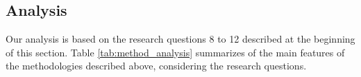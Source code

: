 \subsection{Analysis}
\label{sec:methodology_analisys}

Our analysis is based on the research questions 8 to 12  described at the
beginning of this section. Table \ref{tab:method_analysis}
summarizes of the main features of the methodologies described above,
considering the research questions.


 

